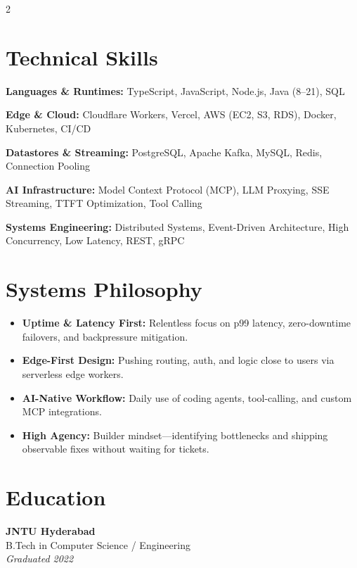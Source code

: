 \documentclass[10pt,letterpaper]{article}
\newcommand{\skillgroup}[2]{
    \textbf{#1:} #2
}
\begin{document}
\begin{paracol}{2}
\section{Technical Skills}

\skillgroup{Languages \& Runtimes}{
TypeScript, JavaScript, Node.js, Java (8--21), SQL
}

\vspace{4pt}

\skillgroup{Edge \& Cloud}{
Cloudflare Workers, Vercel, AWS (EC2, S3, RDS), Docker, Kubernetes, CI/CD
}

\vspace{4pt}

\skillgroup{Datastores \& Streaming}{
PostgreSQL, Apache Kafka, MySQL, Redis, Connection Pooling
}

\vspace{4pt}

\skillgroup{AI Infrastructure}{
Model Context Protocol (MCP), LLM Proxying, SSE Streaming, TTFT Optimization, Tool Calling
}

\vspace{4pt}

\skillgroup{Systems Engineering}{
Distributed Systems, Event-Driven Architecture, High Concurrency, Low Latency, REST, gRPC
}

\vspace{5pt}

\section{Systems Philosophy}

\begin{itemize}
    \item \textbf{Uptime \& Latency First:} Relentless focus on p99 latency, zero-downtime failovers, and backpressure mitigation.
    \item \textbf{Edge-First Design:} Pushing routing, auth, and logic close to users via serverless edge workers.
    \item \textbf{AI-Native Workflow:} Daily use of coding agents, tool-calling, and custom MCP integrations.
    \item \textbf{High Agency:} Builder mindset---identifying bottlenecks and shipping observable fixes without waiting for tickets.
\end{itemize}

\vspace{5pt}

\section{Education}

\textbf{JNTU Hyderabad} \\
B.Tech in Computer Science / Engineering \\
\textit{Graduated 2022}

\end{paracol}
\end{document}
